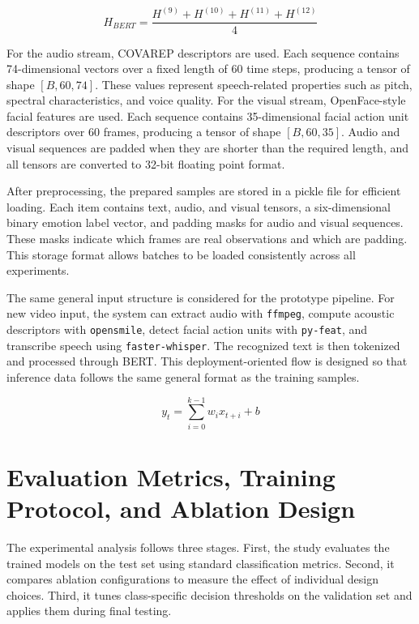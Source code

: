 \begin{equation}
H_{BERT} = \frac{H^{(9)} + H^{(10)} + H^{(11)} + H^{(12)}}{4}
\end{equation}

For the audio stream, COVAREP descriptors are used. Each sequence contains 74-dimensional vectors over a fixed length of 60 time steps, producing a tensor of shape $[B, 60, 74]$. These values represent speech-related properties such as pitch, spectral characteristics, and voice quality. For the visual stream, OpenFace-style facial features are used. Each sequence contains 35-dimensional facial action unit descriptors over 60 frames, producing a tensor of shape $[B, 60, 35]$. Audio and visual sequences are padded when they are shorter than the required length, and all tensors are converted to 32-bit floating point format.

After preprocessing, the prepared samples are stored in a pickle file for efficient loading. Each item contains text, audio, and visual tensors, a six-dimensional binary emotion label vector, and padding masks for audio and visual sequences. These masks indicate which frames are real observations and which are padding. This storage format allows batches to be loaded consistently across all experiments.

The same general input structure is considered for the prototype pipeline. For new video input, the system can extract audio with \texttt{ffmpeg}, compute acoustic descriptors with \texttt{opensmile}, detect facial action units with \texttt{py-feat}, and transcribe speech using \texttt{faster-whisper}. The recognized text is then tokenized and processed through BERT. This deployment-oriented flow is designed so that inference data follows the same general format as the training samples.

\begin{equation}
y_t = \sum_{i=0}^{k-1} w_i x_{t+i} + b
\end{equation}




\section{Evaluation Metrics, Training Protocol, and Ablation Design}
\label{sec:data_analysis}

The experimental analysis follows three stages. First, the study evaluates the trained models on the test set using standard classification metrics. Second, it compares ablation configurations to measure the effect of individual design choices. Third, it tunes class-specific decision thresholds on the validation set and applies them during final testing.

